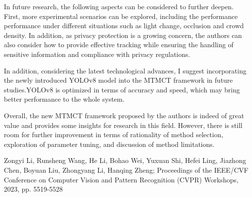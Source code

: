 \documentclass[a4paper,10pt,conference]{COMP9517}
\begin{document}
In future research, the following aspects can be considered to further deepen. First, more experimental scenarios can be explored, including the performance performance under different situations such as light change, occlusion and crowd density. In addition, as privacy protection is a growing concern, the authors can also consider how to provide effective tracking while ensuring the handling of sensitive information and compliance with privacy regulations.

In addition, considering the latest technological advances, I suggest incorporating the newly introduced YOLOv8 model into the MTMCT framework in future studies.YOLOv8 is optimized in terms of accuracy and speed, which may bring better performance to the whole system.

Overall, the new MTMCT framework proposed by the authors is indeed of great value and provides some insights for research in this field. However, there is still room for further improvement in terms of rationality of method selection, exploration of parameter tuning, and discussion of method limitations.

\newpage

\begin{thebibliography}{00}

Zongyi Li, Runsheng Wang, He Li, Bohao Wei, Yuxuan Shi, Hefei Ling, Jiazhong Chen, Boyuan Liu, Zhongyang Li, Hanqing Zheng; Proceedings of the IEEE/CVF Conference on Computer Vision and Pattern Recognition (CVPR) Workshops, 2023, pp. 5519-5528
\end{thebibliography}
\end{document}
